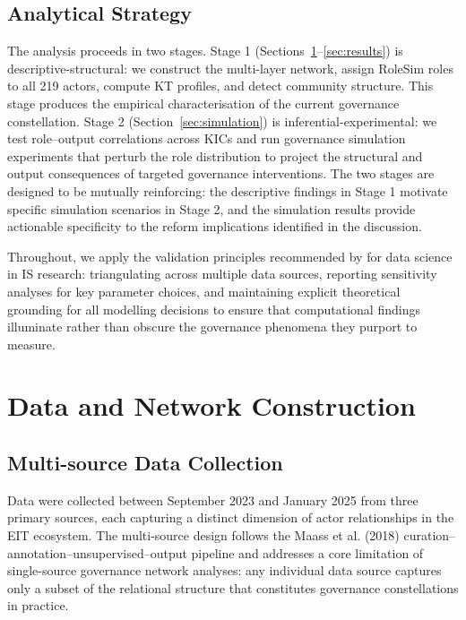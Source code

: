 \documentclass[review,12pt]{elsarticle}
\begin{document}
\subsection{Analytical Strategy}

The analysis proceeds in two stages. Stage 1 (Sections~\ref{sec:data}--\ref{sec:results}) is descriptive-structural: we construct the multi-layer network, assign RoleSim roles to all 219 actors, compute KT profiles, and detect community structure. This stage produces the empirical characterisation of the current governance constellation. Stage 2 (Section~\ref{sec:simulation}) is inferential-experimental: we test role--output correlations across KICs and run governance simulation experiments that perturb the role distribution to project the structural and output consequences of targeted governance interventions. The two stages are designed to be mutually reinforcing: the descriptive findings in Stage 1 motivate specific simulation scenarios in Stage 2, and the simulation results provide actionable specificity to the reform implications identified in the discussion.

Throughout, we apply the validation principles recommended by \citet{maass2018data} for data science in IS research: triangulating across multiple data sources, reporting sensitivity analyses for key parameter choices, and maintaining explicit theoretical grounding for all modelling decisions to ensure that computational findings illuminate rather than obscure the governance phenomena they purport to measure.

\section{Data and Network Construction}
\label{sec:data}

\subsection{Multi-source Data Collection}

Data were collected between September 2023 and January 2025 from three primary sources, each capturing a distinct dimension of actor relationships in the EIT ecosystem. The multi-source design follows the Maass et al. (2018) curation--annotation--unsupervised--output pipeline \citep{maass2018data} and addresses a core limitation of single-source governance network analyses: any individual data source captures only a subset of the relational structure that constitutes governance constellations in practice.
\end{document}
